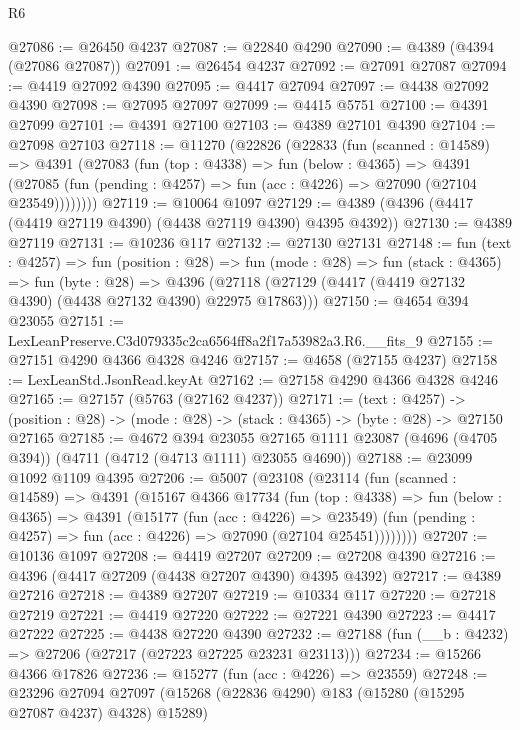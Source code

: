\begin{lexlean}{R6}
\begin{coremodule}
@27086 := @26450 @4237
@27087 := @22840 @4290
@27090 := @4389 (@4394 (@27086 @27087))
@27091 := @26454 @4237
@27092 := @27091 @27087
@27094 := @4419 @27092 @4390
@27095 := @4417 @27094
@27097 := @4438 @27092 @4390
@27098 := @27095 @27097
@27099 := @4415 @5751
@27100 := @4391 @27099
@27101 := @4391 @27100
@27103 := @4389 @27101 @4390
@27104 := @27098 @27103
@27118 := @11270
    (@22826
      (@22833
        (fun (scanned : @14589) =>
        @4391
          (@27083
            (fun (top : @4338) =>
            fun (below : @4365) =>
            @4391
              (@27085 (fun (pending : @4257) => fun (acc : @4226) => @27090 (@27104 @23549))))))))
@27119 := @10064 @1097
@27129 := @4389 (@4396 (@4417 (@4419 @27119 @4390) (@4438 @27119 @4390) @4395 @4392))
@27130 := @4389 @27119
@27131 := @10236 @117
@27132 := @27130 @27131
@27148 := fun (text : @4257) =>
  fun (position : @28) =>
  fun (mode : @28) =>
  fun (stack : @4365) =>
  fun (byte : @28) =>
  @4396 (@27118 (@27129 (@4417 (@4419 @27132 @4390) (@4438 @27132 @4390) @22975 @17863)))
@27150 := @4654 @394 @23055
@27151 := LexLeanPreserve.C3d079335c2ca6564ff8a2f17a53982a3.R6.__fits_9
@27155 := @27151 @4290 @4366 @4328 @4246
@27157 := @4658 (@27155 @4237)
@27158 := LexLeanStd.JsonRead.keyAt
@27162 := @27158 @4290 @4366 @4328 @4246
@27165 := @27157 (@5763 (@27162 @4237))
@27171 := (text : @4257) ->
  (position : @28) -> (mode : @28) -> (stack : @4365) -> (byte : @28) -> @27150 @27165
@27185 := @4672
    @394
    @23055
    @27165
    @1111
    @23087
    (@4696 (@4705 @394))
    (@4711 (@4712 (@4713 @1111) @23055 @4690))
@27188 := @23099 @1092 @1109 @4395
@27206 := @5007
    (@23108
      (@23114
        (fun (scanned : @14589) =>
        @4391
          (@15167
            @4366
            @17734
            (fun (top : @4338) =>
            fun (below : @4365) =>
            @4391
              (@15177
                (fun (acc : @4226) => @23549)
                (fun (pending : @4257) => fun (acc : @4226) => @27090 (@27104 @25451))))))))
@27207 := @10136 @1097
@27208 := @4419 @27207
@27209 := @27208 @4390
@27216 := @4396 (@4417 @27209 (@4438 @27207 @4390) @4395 @4392)
@27217 := @4389 @27216
@27218 := @4389 @27207
@27219 := @10334 @117
@27220 := @27218 @27219
@27221 := @4419 @27220
@27222 := @27221 @4390
@27223 := @4417 @27222
@27225 := @4438 @27220 @4390
@27232 := @27188 (fun (__b : @4232) => @27206 (@27217 (@27223 @27225 @23231 @23113)))
@27234 := @15266 @4366 @17826
@27236 := @15277 (fun (acc : @4226) => @23559)
@27248 := @23296
    @27094
    @27097
    (@15268 (@22836 @4290) @183 (@15280 (@15295 @27087 @4237) @4328) @15289)

\end{coremodule}
\end{lexlean}
